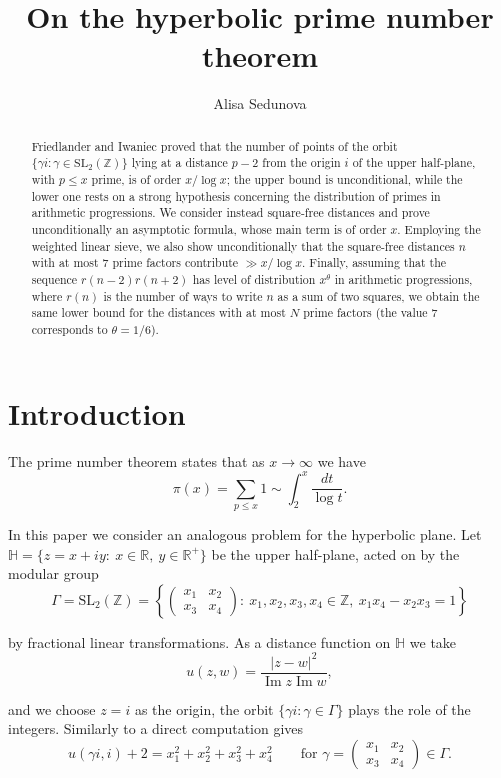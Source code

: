\documentclass[12pt]{amsart}
\title{On the hyperbolic prime number theorem}
\author{Alisa Sedunova}
\theoremstyle{remark}
\newcommand{\Z}{\mathbb{Z}}
\newcommand{\R}{\mathbb{R}}
\newcommand{\Hh}{\mathbb{H}}
\newcommand{\SL}{\mathrm{SL}}
\begin{document}
\begin{abstract}
	Friedlander and Iwaniec proved that the number of points of the orbit $\{\gamma i \colon \gamma\in\SL_2(\Z)\}$ lying at a distance $p-2$ from the origin $i$ of the upper half-plane, with $p\le x$ prime, is of order $x/\log x$; the upper bound is unconditional, while the lower one rests on a strong hypothesis concerning the distribution of primes in arithmetic progressions. We consider instead square-free distances and prove unconditionally an asymptotic formula, whose main term is of order $x$. Employing the weighted linear sieve, we also show unconditionally that the square-free distances $n$ with at most $7$ prime factors contribute $\gg x/\log x$. Finally, assuming that the sequence $r(n-2)r(n+2)$ has level of distribution $x^{\theta}$ in arithmetic progressions, where $r(n)$ is the number of ways to write $n$ as a sum of two squares, we obtain the same lower bound for the distances with at most $N$ prime factors (the value $7$ corresponds to $\theta=1/6$).
\end{abstract}

\maketitle

\tableofcontents

\section{Introduction}

The prime number theorem states that as $x\to\infty$ we have
\[
    \pi(x) = \sum_{p\le x}1 \sim \int_2^x\frac{dt}{\log t}.
\]

In this paper we consider an analogous problem for the hyperbolic plane. 
Let $\Hh=\{z=x+iy:\ x\in\R,\ y\in\R^+\}$ be the upper half-plane, acted on by the modular group
\[
    \Gamma=\SL_2(\Z)=\left\{\begin{pmatrix}x_1&x_2\\ x_3&x_4\end{pmatrix}:\ x_1,x_2,x_3,x_4\in\Z,\ x_1x_4-x_2x_3=1\right\}
\]

by fractional linear transformations. As a distance function on $\Hh$ we take
\[
    u(z,w)=\frac{|z-w|^2}{\operatorname{Im}z\operatorname{Im}w},
\]

and we choose $z=i$ as the origin, the orbit $\{\gamma i:\gamma\in\Gamma\}$ plays the role of the integers. 
Similarly to \cite[(1.8)]{MR2486486} a direct computation gives
\[
    u(\gamma i,i)+2=x_1^2+x_2^2+x_3^2+x_4^2\qquad\text{for }\gamma=\begin{pmatrix}x_1&x_2\\ x_3&x_4\end{pmatrix}\in\Gamma.
\]
\end{document}
